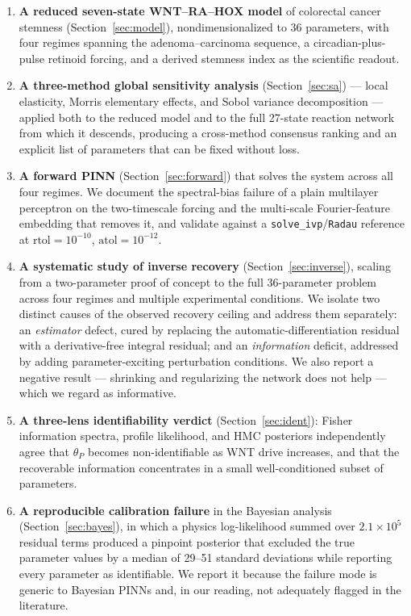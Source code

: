 \documentclass[11pt]{article}
\newcommand{\thP}{\theta_P}
\begin{document}
\begin{enumerate}
\item \textbf{A reduced seven-state WNT--RA--HOX model} of colorectal cancer
stemness (Section~\ref{sec:model}), nondimensionalized to 36 parameters, with
four regimes spanning the adenoma--carcinoma sequence, a circadian-plus-pulse
retinoid forcing, and a derived stemness index as the scientific readout.

\item \textbf{A three-method global sensitivity analysis}
(Section~\ref{sec:sa}) --- local elasticity, Morris elementary effects, and
Sobol variance decomposition --- applied both to the reduced model and to the
full 27-state reaction network from which it descends, producing a
cross-method consensus ranking and an explicit list of parameters that can be
fixed without loss.

\item \textbf{A forward PINN} (Section~\ref{sec:forward}) that solves the
system across all four regimes. We document the spectral-bias failure of a
plain multilayer perceptron on the two-timescale forcing and the multi-scale
Fourier-feature embedding that removes it, and validate against a
\texttt{solve\_ivp}/\texttt{Radau} reference at $\mathrm{rtol}=10^{-10}$,
$\mathrm{atol}=10^{-12}$.

\item \textbf{A systematic study of inverse recovery}
(Section~\ref{sec:inverse}), scaling from a two-parameter proof of concept to
the full 36-parameter problem across four regimes and multiple experimental
conditions. We isolate two distinct causes of the observed recovery ceiling and
address them separately: an \emph{estimator} defect, cured by replacing the
automatic-differentiation residual with a derivative-free integral residual;
and an \emph{information} deficit, addressed by adding parameter-exciting
perturbation conditions. We also report a negative result --- shrinking and
regularizing the network does not help --- which we regard as informative.

\item \textbf{A three-lens identifiability verdict}
(Section~\ref{sec:ident}): Fisher information spectra, profile likelihood, and
HMC posteriors independently agree that $\thP$ becomes non-identifiable as WNT
drive increases, and that the recoverable information concentrates in a small
well-conditioned subset of parameters.

\item \textbf{A reproducible calibration failure} in the Bayesian analysis
(Section~\ref{sec:bayes}), in which a physics log-likelihood summed over
$2.1\times10^5$ residual terms produced a pinpoint posterior that excluded the
true parameter values by a median of 29--51 standard deviations while reporting
every parameter as identifiable. We report it because the failure mode is
generic to Bayesian PINNs and, in our reading, not adequately flagged in the
literature.
\end{enumerate}
\end{document}
